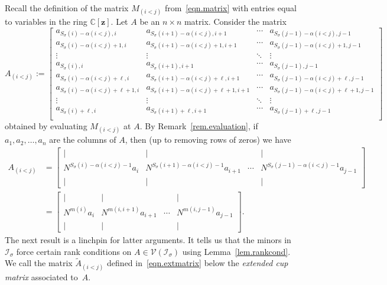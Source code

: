 \documentclass[11pt]{amsart}
\theoremstyle{remark}
\theoremstyle{remark}
\theoremstyle{definition}
\theoremstyle{definition}
\theoremstyle{definition}
\numberwithin{equation}{section}
\newcommand{\C}{\mathbb{C}}           %
\newcommand{\gs}{\sigma}
\newcommand{\ci}{\mathcal{I}}
\newcommand{\cv}{\mathcal{V}}
\newcommand{\al}{\alpha}
\newcommand{\m}[2]{m(#1,#2)}
\newcommand{\mi}[1]{m(#1)}
\begin{document}
Recall the definition of the matrix $M_{(i<j)}$ from~\eqref{eqn.matrix} with entries equal to variables in the ring $\C[\mathbf{z}]$. Let $A$ be an $n\times n$ matrix. Consider the matrix 
\[
A_{(i<j)}:=\begin{bmatrix}
a_{S_\gs(i)-\al(i<j),i} & a_{S_\gs(i+1)-\al(i<j),i+1}& \cdots & a_{S_\gs(j-1)-\al(i<j),j-1}\\
    a_{S_\gs(i)-\al(i<j)+1,i}& a_{S_\gs(i+1)-\al(i<j)+1,i+1} & \cdots &a_{S_\gs(j-1)-\al(i<j)+1,j-1}\\
    \vdots & \vdots &\ddots& \vdots\\
    a_{S_\gs(i),i} & a_{S_\gs(i+1),i+1}& \cdots & a_{S_\gs(j-1),j-1}\\
a_{S_\gs(i)-\al(i<j)+\ell,i} & a_{S_\gs(i+1)-\al(i<j)+\ell,i+1}& \cdots & a_{S_\gs(j-1)-\al(i<j)+\ell,j-1}\\
    a_{S_\gs(i)-\al(i<j)+\ell+1,i}& a_{S_\gs(i+1)-\al(i<j)+\ell+1,i+1} & \cdots &a_{S_\gs(j-1)-\al(i<j)+\ell+1,j-1}\\
    \vdots & \vdots &\ddots& \vdots\\
    a_{S_\gs(i)+\ell,i} & a_{S_\gs(i+1)+\ell,i+1}& \cdots & a_{S_\gs(j-1)+\ell,j-1}\\
\end{bmatrix}
\]
obtained by evaluating $M_{(i<j)}$ at $A$. By Remark~\ref{rem.evaluation}, if $a_1, a_2, \ldots, a_n$ are the columns of $A$, then (up to removing rows of zeros) we have
\begin{align*}
A_{(i<j)} &= \begin{bmatrix}  | & | &  & |  \\   N^{S_\gs(i)-\al(i<j)-1}a_i &  N^{S_\gs(i+1)-\al(i<j)-1}a_{i+1} & \cdots &  N^{S_\gs(j-1)-\al(i<j)-1}a_{j-1} \\ | & | &  & |   \end{bmatrix} \\ 
&= \begin{bmatrix}  | & | &  & |  \\   N^{\mi{i}}a_i &  N^{\m{i}{i+1}}a_{i+1} & \cdots &  N^{\m{i}{j-1}}a_{j-1} \\ | & | &  & |   \end{bmatrix}.
\end{align*}
The next result is a linchpin for latter arguments. It tells us that the minors in $\ci_\gs$ force certain rank conditions on $A\in \cv(\ci_\gs)$ using Lemma~\ref{lem.rankcond}. 
We call the matrix $\widetilde{A}_{(i<j)}$ defined in~\eqref{eqn.extmatrix} below the \emph{extended cup matrix} associated to~$A$. 
\end{document}
